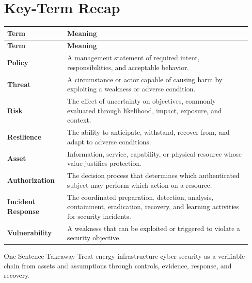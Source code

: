 \documentclass[11pt,letterpaper]{article}
\begin{document}
\section*{Key-Term Recap}
\begin{longtable}{>{\RaggedRight\arraybackslash}p{}>{\RaggedRight\arraybackslash}p{}}
\toprule\rowcolor{Navy}\color{white}\textbf{Term} & \color{white}\textbf{Meaning}\\\midrule
\endfirsthead
\toprule\rowcolor{Navy}\color{white}\textbf{Term} & \color{white}\textbf{Meaning}\\\midrule
\endhead
\textbf{Policy} & A management statement of required intent, responsibilities, and acceptable behavior. \\\midrule
\textbf{Threat} & A circumstance or actor capable of causing harm by exploiting a weakness or adverse condition. \\\midrule
\textbf{Risk} & The effect of uncertainty on objectives, commonly evaluated through likelihood, impact, exposure, and context. \\\midrule
\textbf{Resilience} & The ability to anticipate, withstand, recover from, and adapt to adverse conditions. \\\midrule
\textbf{Asset} & Information, service, capability, or physical resource whose value justifies protection. \\\midrule
\textbf{Authorization} & The decision process that determines which authenticated subject may perform which action on a resource. \\\midrule
\textbf{Incident Response} & The coordinated preparation, detection, analysis, containment, eradication, recovery, and learning activities for security incidents. \\\midrule
\textbf{Vulnerability} & A weakness that can be exploited or triggered to violate a security objective. \\\midrule
\bottomrule
\end{longtable}
\begin{CornellExamBox}{One-Sentence Takeaway}
Treat energy infrastructure cyber security as a verifiable chain from assets and assumptions through controls, evidence, response, and recovery.
\end{CornellExamBox}
\end{document}

